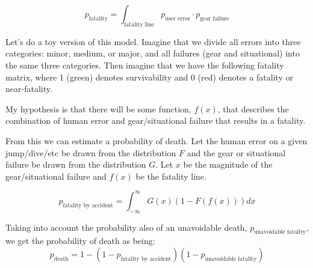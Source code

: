 \documentclass[11pt]{amsart}
\begin{document}
$$p_\text{fatality} = \int_\text{fatality line} p_\text{user error}\cdot p_\text{gear failure}$$

Let's do a toy version of this model. Imagine that we divide all errors into three categories: minor, medium, or major, and all failures (gear and situational) into the same three categories. Then imagine that we have the following fatality matrix, where 1 (green) denotes survivability and 0 (red) denotes a fatality or near-fatality. 

\begin{center}
\vrule{}\vrule

\end{center}
My hypothesis is that there will be some function, $f(x)$, that describes the combination of human error and gear/situational failure that results in a fatality.

From this we can estimate a probability of death. Let the human error on a given jump/dive/etc be drawn from the distribution $F$ and the gear or situational failure be drawn from the distribution $G$. Let $x$ be the magnitude of the gear/situational failure and $f(x)$ be the fatality line.

$$p_\text{fatality by accident} =\int_{-\infty}^\infty G(x)(1-F(f(x)))dx$$

Taking into account the probability also of an unavoidable death, $p_\text{unavoidable fatality}$, we get the probability of death as being:
$$p_\text{death} = 1 - (1 - p_\text{fatality by accident})(1-p_\text{unavoidable fatality})$$
\end{document}

